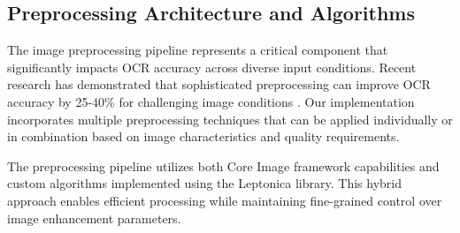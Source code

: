 \begin{table}[H]
\subsection{Preprocessing Architecture and Algorithms}

The image preprocessing pipeline represents a critical component that significantly impacts OCR accuracy across diverse input conditions. Recent research has demonstrated that sophisticated preprocessing can improve OCR accuracy by 25-40\% for challenging image conditions \cite{li2022enhancing}. Our implementation incorporates multiple preprocessing techniques that can be applied individually or in combination based on image characteristics and quality requirements.

The preprocessing pipeline utilizes both Core Image framework capabilities and custom algorithms implemented using the Leptonica library. This hybrid approach enables efficient processing while maintaining fine-grained control over image enhancement parameters.

\begin{figure}[H]
    \centering
\end{figure}
\end{table}

